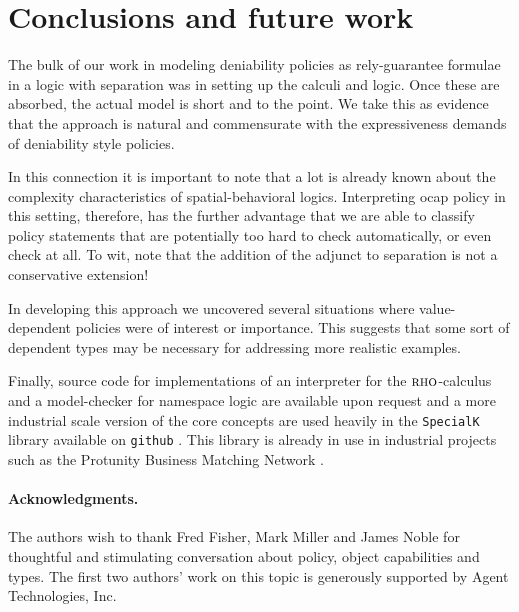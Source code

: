 \documentclass[]{acm_proc_article-sp}
\numberwithin{equation}{subsection}
\newcommand{\rhoc}{${\textsc{rho}}$-calculus}
\begin{document}
\section{Conclusions and future work}

The bulk of our work in modeling deniability policies as
rely-guarantee formulae in a logic with separation was in setting up
the calculi and logic. Once these are absorbed, the actual model is
short and to the point. We take this as evidence that the approach is
natural and commensurate with the expressiveness demands of
deniability style policies.

In this connection it is important to note that a lot is already known
about the complexity characteristics of spatial-behavioral
logics. Interpreting ocap policy in this setting, therefore, has the
further advantage that we are able to classify policy statements that
are potentially too hard to check automatically, or even check at
all. To wit, \cite{Caires04eliminationof} note that the addition of
the adjunct to separation is not a conservative extension!

In developing this approach we uncovered several situations where
value-dependent policies were of interest or importance. This suggests
that some sort of dependent types may be necessary for addressing more
realistic examples.

Finally, source code for implementations of an interpreter for the
{\rhoc} and a model-checker for namespace logic are available upon
request and a more industrial scale version of the core concepts are
used heavily in the \texttt{SpecialK} library available on
\texttt{github} \cite{SpecialK}. This library is already in use in
industrial projects such as the Protunity Business Matching Network
\cite{Protunity}.

\paragraph{Acknowledgments.}
The authors wish to thank Fred Fisher, Mark Miller and James Noble for thoughtful
and stimulating conversation about policy, object capabilities and
types. The first two authors' work on this topic is generously supported
by Agent Technologies, Inc.



\end{document}

